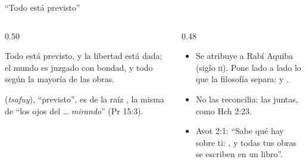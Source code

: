 \begin{frame}{``Todo está previsto''}
\begin{columns}[t,onlytextwidth]
\begin{column}{0.50\textwidth}
\begin{center}\large{}\end{center}
\begin{cita}Todo está previsto, y la libertad está dada; el mundo es juzgado con bondad, y todo según la mayoría de las obras.\end{cita}
\scriptsize{} (\emph{tsafuy}), ``previsto'', es de la raíz , la misma de ``los ojos del \SENOR{}\ldots{} \emph{mirando}'' (Pr 15:3).
\end{column}
\begin{column}{0.48\textwidth}\small
\begin{itemize}
\item Se atribuye a Rabí Aquiba (siglo \textsc{ii}). Pone lado a lado lo que la filosofía separa:  y .
\item No las reconcilia: las  juntas, como Hch 2:23.
\item Avot 2:1: ``Sabe qué hay sobre ti: , y todas tus obras se escriben en un libro''.
\end{itemize}
\end{column}
\end{columns}
\end{frame}

